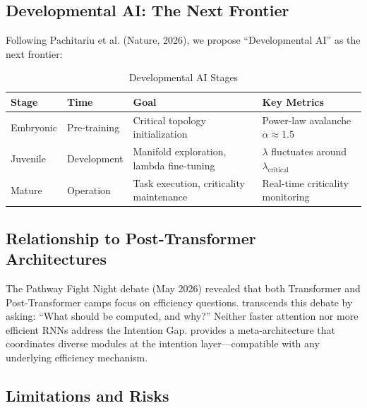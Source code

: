 \documentclass[11pt,a4paper]{article}
\theoremstyle{definition}
\theoremstyle{remark}
\newcommand{\CAA}{\text{CAA-X}}
\begin{document}
\subsection{Developmental AI: The Next Frontier}\label{subsec:developmental}

Following Pachitariu et al. (Nature, 2026), we propose ``Developmental AI'' as the next frontier:

\begin{table}[htbp]
\centering
\caption{Developmental AI Stages}
\label{tab:developmental}
\begin{tabular}{llll}
\toprule
\textbf{Stage} & \textbf{Time} & \textbf{Goal} & \textbf{Key Metrics} \\
\midrule
Embryonic & Pre-training & Critical topology initialization & Power-law avalanche $\alpha \approx 1.5$ \\
Juvenile & Development & Manifold exploration, lambda fine-tuning & $\lambda$ fluctuates around $\lambda_{\text{critical}}$ \\
Mature & Operation & Task execution, criticality maintenance & Real-time criticality monitoring \\
\bottomrule
\end{tabular}
\end{table}

\subsection{Relationship to Post-Transformer Architectures}\label{subsec:post-transformer}

The Pathway Fight Night debate (May 2026) revealed that both Transformer and Post-Transformer camps focus on efficiency questions. \CAA{} transcends this debate by asking: ``What should be computed, and why?'' Neither faster attention nor more efficient RNNs address the Intention Gap. \CAA{} provides a meta-architecture that coordinates diverse modules at the intention layer---compatible with any underlying efficiency mechanism.

\subsection{Limitations and Risks}\label{subsec:limitations}
\end{document}
